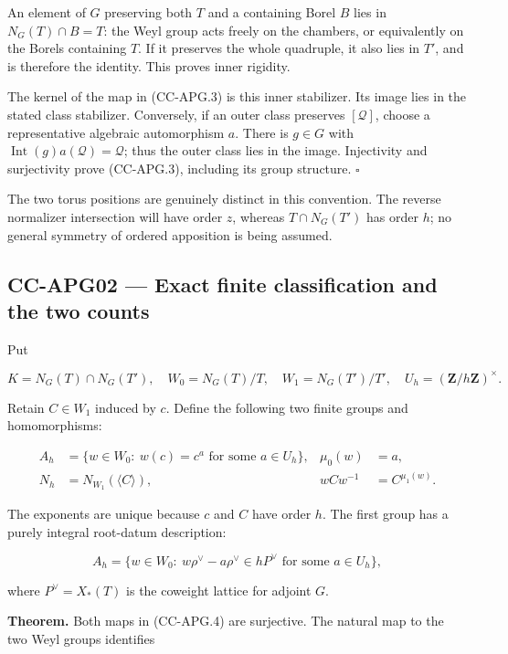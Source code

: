 \documentclass[11pt,a4paper]{article}
\theoremstyle{definition}\newtheorem{definition}[theorem]{Definition}
\theoremstyle{remark}\newtheorem{remark}[theorem]{Remark}
\begin{document}
An element of \(G\) preserving both \(T\) and a containing Borel \(B\)
lies in \(N_G(T)\cap B=T\): the Weyl group acts freely on the chambers,
or equivalently on the Borels containing \(T\). If it preserves the
whole quadruple, it also lies in \(T'\), and is therefore the identity.
This proves inner rigidity.

The kernel of the map in (CC-APG.3) is this inner stabilizer. Its image
lies in the stated class stabilizer. Conversely, if an outer class
preserves \([\mathcal Q]\), choose a representative algebraic
automorphism \(a\). There is \(g\in G\) with
\(\operatorname{Int}(g)a(\mathcal Q)=\mathcal Q\); thus the outer class
lies in the image. Injectivity and surjectivity prove (CC-APG.3),
including its group structure. \(\square\)

The two torus positions are genuinely distinct in this convention. The
reverse normalizer intersection will have order \(z\), whereas
\(T\cap N_G(T')\) has order \(h\); no general symmetry of ordered
apposition is being assumed.

\subsection{CC-APG02 --- Exact finite classification and the two
counts}\label{cc-apg02-exact-finite-classification-and-the-two-counts}

Put

\[
 K=N_G(T)\cap N_G(T'),\quad
 W_0=N_G(T)/T,\quad W_1=N_G(T')/T',
 \quad U_h=(\mathbf Z/h\mathbf Z)^\times.
\]

Retain \(C\in W_1\) induced by \(c\). Define the following two finite
groups and homomorphisms:

\[
\begin{aligned}
 A_h&=\{w\in W_0:\ w(c)=c^a\text{ for some }a\in U_h\},
 &\mu_0(w)&=a,\\
 N_h&=N_{W_1}(\langle C\rangle),
 &w C w^{-1}&=C^{\mu_1(w)}.
\end{aligned}
 \tag{CC-APG.4}
\]

The exponents are unique because \(c\) and \(C\) have order \(h\). The
first group has a purely integral root-datum description:

\[
 A_h=\{w\in W_0:\ w\rho^\vee-a\rho^\vee\in hP^\vee
                   \text{ for some }a\in U_h\},
 \tag{CC-APG.5}
\]

where \(P^\vee=X_*(T)\) is the coweight lattice for adjoint \(G\).

\textbf{Theorem.} Both maps in (CC-APG.4) are surjective. The natural
map to the two Weyl groups identifies
\end{document}

